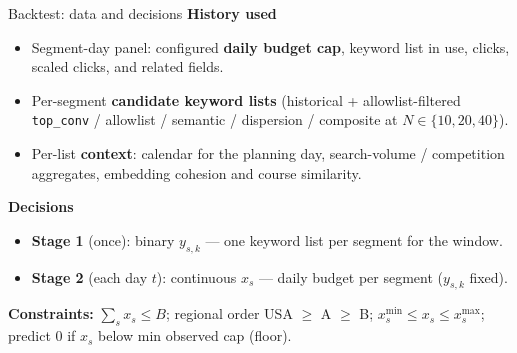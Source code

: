 \documentclass[11pt]{beamer}
\begin{document}
\begin{frame}{Backtest: data and decisions}
  \textbf{History used}
  \begin{itemize}
    \item Segment-day panel: configured \textbf{daily budget cap}, keyword list in use, clicks,
      scaled clicks, and related fields.
    \item Per-segment \textbf{candidate keyword lists} (historical + allowlist-filtered
      \texttt{top\_conv} / allowlist / semantic / dispersion / composite at $N\in\{10,20,40\}$).
    \item Per-list \textbf{context}: calendar for the planning day, search-volume / competition
      aggregates, embedding cohesion and course similarity.
  \end{itemize}

  \vspace{0.35em}
  \textbf{Decisions}
  \begin{itemize}
    \item \textbf{Stage 1} (once): binary $y_{s,k}$ --- one keyword list per segment for the window.
    \item \textbf{Stage 2} (each day $t$): continuous $x_s$ --- daily budget per segment ($y_{s,k}$ fixed).
  \end{itemize}

  \vspace{0.35em}
  \textbf{Constraints:} $\sum_s x_s \leq B$; regional order USA $\geq$ A $\geq$ B;
  $x_s^{\min}\leq x_s\leq x_s^{\max}$; predict $0$ if $x_s$ below min observed cap (floor).
\end{frame}
\end{document}
